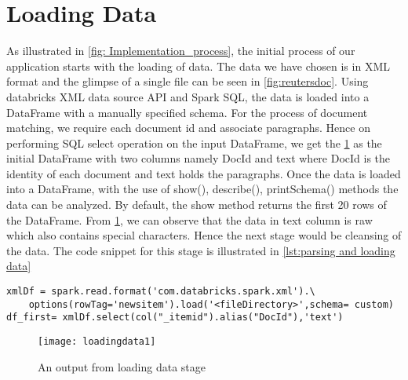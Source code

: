 \section{Loading Data}
\label{section: loading data}
As illustrated in \ref{fig: Implementation_process}, the initial process of our application starts with the loading of data. The data we have chosen is in XML format and the glimpse of a single file can be seen in \ref{fig:reutersdoc}. Using databricks XML data source API and Spark SQL, the data is loaded into a DataFrame with a manually specified schema. For the process of document matching, we require each document id and associate paragraphs. Hence on performing SQL select operation on the input DataFrame, we get the \ref{fig: loadingdata1} as the initial DataFrame with two columns namely DocId and text where DocId is the identity of each document and text holds the paragraphs. Once the data is loaded into a DataFrame, with the use of show(), describe(), printSchema() methods the data can be analyzed. By default, the show method returns the first 20 rows of the DataFrame.
From \ref{fig: loadingdata1}, we can observe that the data in text column is raw which also contains special characters. Hence the next stage would be cleansing of the data. The code snippet for this stage is illustrated in \ref{lst:parsing and loading data}

\begin{lstlisting}[style=Java,float=htb,caption={Python code for parsing and loading of data into a DataFrame},label={lst:parsing and loading data}]
xmlDf = spark.read.format('com.databricks.spark.xml').\
	options(rowTag='newsitem').load('<fileDirectory>',schema= custom)
df_first= xmlDf.select(col("_itemid").alias("DocId"),'text')
\end{lstlisting}

\begin{figure}[tbp]
	\centering
		\texttt{[image: loadingdata1]}
	\caption{An output from loading data stage}
	\label{fig: loadingdata1}
\end{figure}

